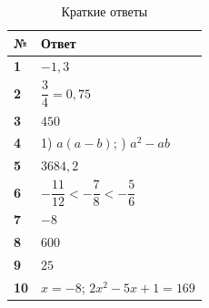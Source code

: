 \documentclass[a4paper,12pt]{article}
\begin{document}
\begin{table}[ht]
\centering

\caption{Краткие ответы}

\begin{tabularx}{\linewidth}{
  @{}
  >{\bfseries}p{1.2cm}
  X
  @{}
}

\toprule

№ & Ответ \\

\midrule

1
&
$-1{,}3$
\\

2
&
$\dfrac34=0{,}75$
\\

3
&
$450$
\\

4
&
1) $a(a-b)$;
\quad
2) $a^2-ab$
\\

5
&
$3684{,}2$
\\

6
&
$
-\dfrac{11}{12}
<
-\dfrac78
<
-\dfrac56
$
\\

7
&
$-8$
\\

8
&
$600$
\\

9
&
$25$
\\

10
&
$x=-8$;
\quad
$2x^2-5x+1=169$
\\

\bottomrule

\end{tabularx}
\end{table}
\end{document}
